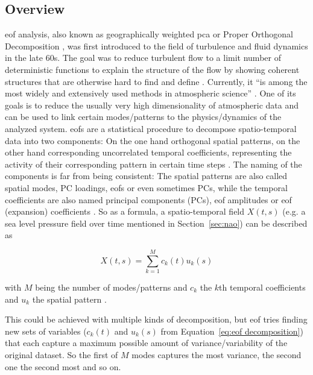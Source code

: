 \subsection{Overview}

\acf{eof} analysis, also known as geographically weighted \ac{pca} or Proper Orthogonal Decomposition \cite{vietinghoffdiss}, was first introduced to the field of turbulence and fluid dynamics in the late 60s. The goal was to reduce turbulent flow to a limit number of deterministic functions to explain the structure of the flow by showing coherent structures that are otherwise hard to find and define \cite{weiss_tutorial_2019}. Currently, it \enquote{is among the most widely and extensively used methods in atmospheric science} \cite{hannachi_empirical_2007}. 
One of its goals is to reduce the usually very high dimensionality of atmospheric data and can be used to link certain modes/patterns to the physics/dynamics of the analyzed system.  
\acp{eof} are a statistical procedure to decompose spatio-temporal data into two components: On the one hand orthogonal spatial patterns, on the other hand corresponding uncorrelated temporal coefficients, representing the activity of their corresponding pattern in certain time steps \cite{hannachi_empirical_2007, vietinghoffdiss}. 
The naming of the components is far from being consistent: The spatial patterns are also called spatial modes, PC loadings, \acp{eof} or even sometimes PCs, while the temporal coefficients are also named principal components (PCs), \ac{eof} amplitudes or \ac{eof} (expansion) coefficients \cite{hannachi_empirical_2007}. 
So as a formula, a spatio-temporal field $X(t, s)$ (e.g. a sea level pressure field over time mentioned in Section~\ref{sec:nao}) can be described as

\begin{equation}
  X(t, s) = \sum^{M}_{k=1} c_k(t) u_k(s)
  \label{eq:eof decomposition}
\end{equation}

with $M$ being the number of modes/patterns and  $c_k$ the $k$th temporal coefficients and $u_k$ the spatial pattern \cite{hannachi_empirical_2007}. 

This could be achieved with multiple kinds of decomposition, but \ac{eof} tries finding new sets of variables ($c_k(t)$ and $u_k(s)$ from Equation~\ref{eq:eof decomposition}) that each capture a maximum possible amount of variance/variability of the original dataset. 
So the first of $M$ modes captures the most variance, the second one the second most and so on. 

